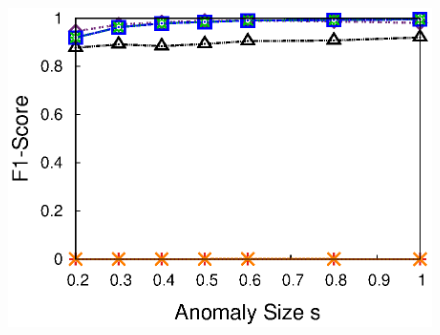 {\begin{figure}[h!]
{{    \includegraphics[width=\figurewidthQ]{fig/dect.AnomalySize.srmf_based_pred.Mob-Recv1run1.dat0_matrix.mat_dB.txt.1000.90.1.1000.r32.period1.org.2d.elem.ind.elem1.lr0.5.burst1.na0.05.noise0.thresh0.eps}
  }
  \hspace{-0.1in}
  \hspace{-0.1in}
  \subfigure[CU RSSI]{
}}
\end{figure}}
